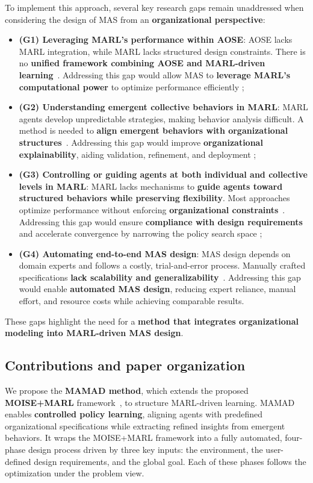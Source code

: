 \documentclass[journal]{IEEEtai}
\begin{document}
To implement this approach, several key research gaps remain unaddressed when considering the design of MAS from an \textbf{organizational perspective}:
%
\begin{itemize}
  \item \textbf{(G1) Leveraging MARL's performance within AOSE}: AOSE lacks MARL integration, while MARL lacks structured design constraints. There is no \textbf{unified framework combining AOSE and MARL-driven learning}~\cite{Cossentino2014}. Addressing this gap would allow MAS to \textbf{leverage MARL's computational power} to optimize performance efficiently ;
  
  \item \textbf{(G2) Understanding emergent collective behaviors in MARL}: MARL agents develop unpredictable strategies, making behavior analysis difficult. A method is needed to \textbf{align emergent behaviors with organizational structures}~\cite{Du2022, Papoudakis2021}. Addressing this gap would improve \textbf{organizational explainability}, aiding validation, refinement, and deployment ;
  
  \item \textbf{(G3) Controlling or guiding agents at both individual and collective levels in MARL}: MARL lacks mechanisms to \textbf{guide agents toward structured behaviors while preserving flexibility}. Most approaches optimize performance without enforcing \textbf{organizational constraints}~\cite{Oroojlooy2023}. Addressing this gap would ensure \textbf{compliance with design requirements} and accelerate convergence by narrowing the policy search space ;
  
  \item \textbf{(G4) Automating end-to-end MAS design}: MAS design depends on domain experts and follows a costly, trial-and-error process. Manually crafted specifications \textbf{lack scalability and generalizability}~\cite{Nguyen2020}. Addressing this gap would enable \textbf{automated MAS design}, reducing expert reliance, manual effort, and resource costs while achieving comparable results.
\end{itemize}
%
These gaps highlight the need for a \textbf{method that integrates organizational modeling into MARL-driven MAS design}.


\subsection{Contributions and paper organization}

We propose the \textbf{MAMAD method}, which extends the proposed \textbf{MOISE+MARL} framework~\cite{soule2025moisemarl}, to structure MARL-driven learning. MAMAD enables \textbf{controlled policy learning}, aligning agents with predefined organizational specifications while extracting refined insights from emergent behaviors. It wraps the MOISE+MARL framework into a fully automated, four-phase design process driven by three key inputs: the environment, the user-defined design requirements, and the global goal. Each of these phases follows the optimization under the problem view.
\end{document}
